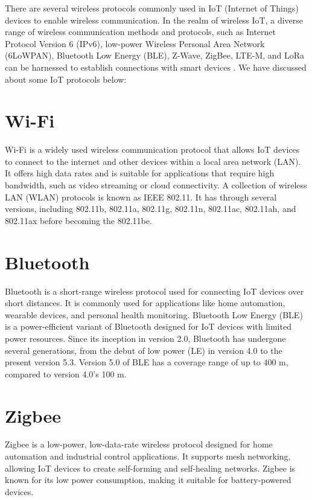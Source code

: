 There are several wireless protocols commonly used in IoT (Internet of Things) devices to enable wireless communication. In the realm of wireless IoT, a diverse range of wireless communication methods and protocols, such as Internet Protocol Version 6 (IPv6), low-power Wireless Personal Area Network (6LoWPAN), Bluetooth Low Energy (BLE), Z-Wave, ZigBee, LTE-M, and LoRa can be harnessed to establish connections with smart devices \cite{IoT_Protocol}. We have discussed about some IoT protocols below:

\section{Wi-Fi}
Wi-Fi is a widely used wireless communication protocol that allows IoT devices to connect to the internet and other devices within a local area network (LAN). It offers high data rates and is suitable for applications that require high bandwidth, such as video streaming or cloud connectivity. A collection of wireless LAN (WLAN) protocols is known as IEEE 802.11. It has through several versions, including 802.11b, 802.11a, 802.11g, 802.11n, 802.11ac, 802.11ah, and 802.11ax before becoming the 802.11be.

\section{Bluetooth}
Bluetooth is a short-range wireless protocol used for connecting IoT devices over short distances. It is commonly used for applications like home automation, wearable devices, and personal health monitoring. Bluetooth Low Energy (BLE) is a power-efficient variant of Bluetooth designed for IoT devices with limited power resources. Since its inception in version 2.0, Bluetooth has undergone several generations, from the debut of low power (LE) in version 4.0 to the present version 5.3. Version 5.0 of BLE has a coverage range of up to 400 m, compared to version 4.0's 100 m.

\section{Zigbee}
 Zigbee is a low-power, low-data-rate wireless protocol designed for home automation and industrial control applications. It supports mesh networking, allowing IoT devices to create self-forming and self-healing networks. Zigbee is known for its low power consumption, making it suitable for battery-powered devices.
